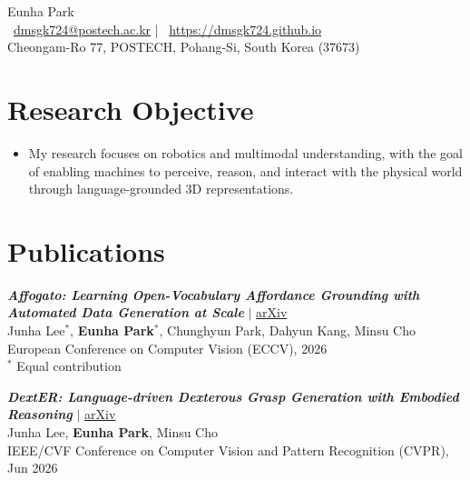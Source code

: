 \documentclass[11pt, letterpaper]{article}
\begin{document}
\begin{center}
  {\Huge Eunha Park}\\[4pt]
  \faEnvelope\ \href{mailto:dmsgk724@postech.ac.kr}{dmsgk724@postech.ac.kr}
  \quad|\quad
  \faGlobe\ \href{https://dmsgk724.github.io}{https://dmsgk724.github.io}\\[2pt]
  Cheongam-Ro 77, POSTECH, Pohang-Si, South Korea (37673)
\end{center}

\vspace{6pt}

\section{Research Objective}

\begin{itemize}[leftmargin=1.5em, topsep=2pt, itemsep=1pt]
  \item[] My research focuses on robotics and multimodal understanding,
          with the goal of enabling machines to perceive, reason, and interact
          with the physical world through language-grounded 3D representations.
\end{itemize}

\section{Publications}

\begin{enumerate}[leftmargin=*, topsep=4pt, itemsep=8pt, label={[\arabic*]}]

  \item \textbf{\textit{Affogato: Learning Open-Vocabulary Affordance Grounding with Automated Data Generation at Scale}}
        $|$ \href{https://arxiv.org/abs/2506.12009}{arXiv}\\
        Junha Lee$^*$, \textbf{Eunha Park}$^*$, Chunghyun Park, Dahyun Kang, Minsu Cho\\
        European Conference on Computer Vision (ECCV), 2026\\
        {\small $^*$ Equal contribution}

  \item \textbf{\textit{DextER: Language-driven Dexterous Grasp Generation with Embodied Reasoning}}
        $|$ \href{https://arxiv.org/pdf/2601.16046}{arXiv}\\
        Junha Lee, \textbf{Eunha Park}, Minsu Cho\\
        IEEE/CVF Conference on Computer Vision and Pattern Recognition (CVPR), Jun 2026

\end{enumerate}
\end{document}
